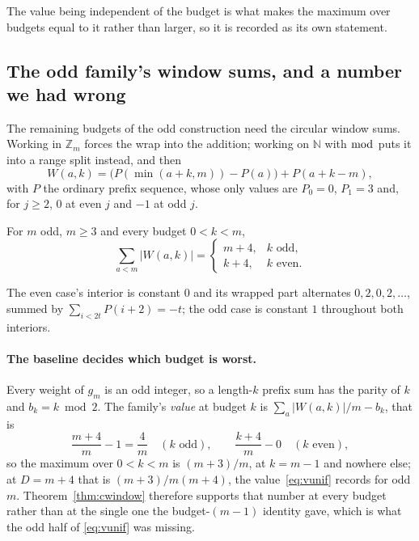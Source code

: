 The value being independent of the budget is what makes the maximum over budgets equal to it
rather than larger, so it is recorded as its own statement.



\subsection{The odd family's window sums, and a number we had wrong}
\label{sec:cwindow}

The remaining budgets of the odd construction need the circular window sums. Working in
$\mathbb{Z}_{m}$ forces the wrap into the addition; working on $\mathbb{N}$ with $\bmod$ puts
it into a range split instead, and then
\[
W(a,k)=\bigl(P(\min(a+k,m))-P(a)\bigr)+P(a+k-m),
\]
with $P$ the ordinary prefix sequence, whose only values are $P_{0}=0$, $P_{1}=3$ and, for
$j\ge2$, $0$ at even $j$ and $-1$ at odd $j$.

\begin{theorem}
\label{thm:cwindow}
For $m$ odd, $m\ge3$ and every budget $0<k<m$,
\[
\sum_{a<m}\bigl|W(a,k)\bigr|=
\begin{cases} m+4, & k\text{ odd},\\[2pt] k+4, & k\text{ even}.\end{cases}
\]
\end{theorem}

The even case's interior is constant $0$ and its wrapped part alternates $0,2,0,2,\dots$,
summed by $\sum_{i<2t}P(i+2)=-t$; the odd case is constant $1$ throughout both interiors.

\paragraph{The baseline decides which budget is worst.} Every weight of $g_{m}$ is an odd
integer, so a length-$k$ prefix sum has the parity of $k$ and $b_{k}=k\bmod2$. The family's
\emph{value} at budget $k$ is $\sum_{a}|W(a,k)|/m-b_{k}$, that is
\[
\frac{m+4}{m}-1=\frac4m\quad(k\text{ odd}),
\qquad
\frac{k+4}{m}-0\quad(k\text{ even}),
\]
so the maximum over $0<k<m$ is $(m+3)/m$, at $k=m-1$ and nowhere else; at $D=m+4$ that is
$(m+3)/m(m+4)$, the value~\eqref{eq:vunif} records for odd $m$. Theorem~\ref{thm:cwindow}
therefore supports that number at every budget rather than at the single one the
budget-$(m-1)$ identity gave, which is what the odd half of \eqref{eq:vunif} was missing.

